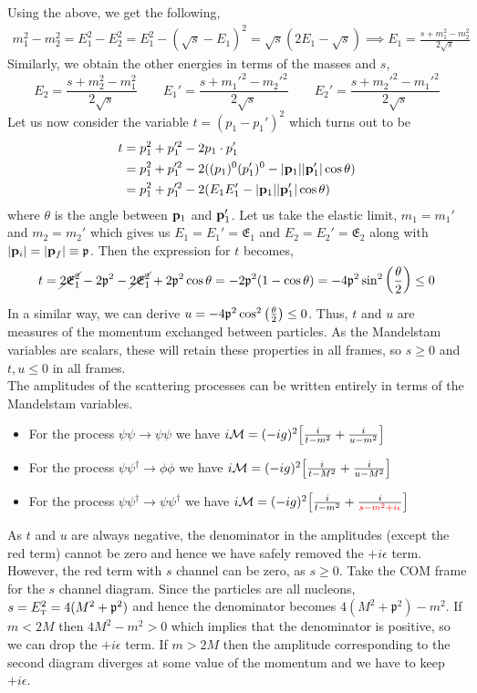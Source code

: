 Using the above, we get the following,
 \begin{align*}
   m_1^2-m_2^2 =  E_1^2-E_2^2 =E_1^2-(\sqrt{s}-E_1)^2 = \sqrt{s}(2E_1-\sqrt{s}) \implies E_1 = \frac{s+m_1^2-m_2^2}{2\sqrt{s}}
 \end{align*} 
 Similarly, we obtain the other energies in terms of the masses and $s$,
 $$E_2 = \frac{s+m_2^2-m_1^2}{2\sqrt{s}}\qquad E_1' = \frac{s+m_1'^2-m_2'^2}{2\sqrt{s}}\qquad E_2' = \frac{s+m_2'^2-m_1'^2}{2\sqrt{s}}$$
 Let us now consider the variable $t = (p_1-p_1')^2$ which turns out to be 
 \begin{align*}
    t &=p_1^2+p_1'^2-2 p_1\cdot p_1'\\
    &=p_1^2+p_1'^2 -2((p_1)^0(p_1')^0 - |\vb{p}_1||\vb{p}_1'|\cos\theta)\\
    &=p_1^2+p_1'^2 -2(E_1E_1' - |\vb{p}_1||\vb{p}_1'|\cos\theta)
 \end{align*}
 where $\theta$ is the angle between $\vb{p}_1$ and $\vb{p}_1'$. Let us take the elastic limit, $m_1=m_1'$ and $m_2=m_2'$ which gives us $E_1=E_1'=\mathfrak{E}_1$ and $E_2=E_2'=\mathfrak{E}_2$ along with $|\vb{p}_i| = |\vb{p}_f|\equiv \mathfrak{p}$. Then the expression for $t$ becomes, 
 $$t =\cancel{2\mathfrak{E}_1^2}-2\mathfrak{p}^2 - \cancel{2\mathfrak{E}_1^2}+2\mathfrak{p}^2\cos\theta =-2\mathfrak{p}^2(1-\cos\theta) = -4\mathfrak{p}^2\sin^2\qty(\frac{\theta}{2})\leq 0$$
 In a similar way, we can derive $u = -4\mathfrak{p}^2\cos^2\qty(\frac{\theta}{2})\leq 0$. Thus, $t$ and $u$ are measures of the momentum exchanged between particles. As the Mandelstam variables are scalars, these will retain these properties in all frames, so $s\geq0$ and $t,u\leq 0$ in all frames.\\[0.2cm] The amplitudes of the scattering processes can be written entirely in terms of the Mandelstam variables. 
 \begin{itemize}
    \item For the process $\psi\psi\longrightarrow\psi\psi$ we have $i\mathcal M = (-ig)^2\qty[\frac{i}{t-m^2}+\frac{i}{u-m^2}]$
    \item For the process $\psi\psi^\dagger\longrightarrow\phi\phi$ we have $i\mathcal M = (-ig)^2\qty[\frac{i}{t-M^2}+\frac{i}{u-M^2}]$
    \item For the process $\psi\psi^\dagger\longrightarrow\psi\psi^\dagger$ we have $i\SM = (-ig)^2\qty[\frac{i}{t-m^2}+\frac{i}{\mathcolor{red}{s-m^2+i\epsilon}}]$
 \end{itemize}
As $t$ and $u$ are always negative, the denominator in the amplitudes (except the red term) cannot be zero and hence we have safely removed the $+i\epsilon$ term. However, the red term with $s$ channel can be zero, as $s\geq 0$. Take the COM frame for the $s$ channel diagram. Since the particles are all nucleons, $s=E_{\text{\tiny T}}^2 = 4(M^2+\mathfrak{p}^2)$ and hence the denominator becomes $4(M^2+\mathfrak{p}^2)-m^2$. If $m<2M$ then $4M^2-m^2>0$ which implies that the denominator is positive, so we can drop the $+i\epsilon$ term. If $m>2M$ then the amplitude corresponding to the second diagram diverges at some value of the momentum and we have to keep $+i\epsilon$.
